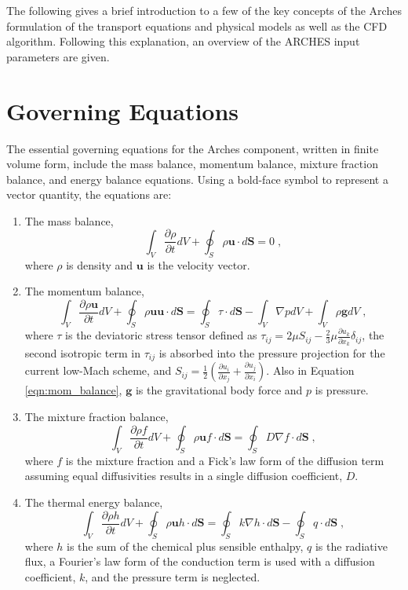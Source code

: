 The following gives a brief introduction to a few of the key concepts of the Arches formulation of the transport equations and physical models as well as the CFD algorithm.  Following this explanation, an overview of the ARCHES input parameters are given.  

\section{Governing Equations}
%
The essential governing equations for the Arches component, written
in finite volume form, include the mass balance, momentum balance,
mixture fraction balance, and energy balance equations. Using a bold-face
symbol to represent a vector quantity, the equations are: 
\begin{enumerate}
\item The mass balance, \begin{equation}
\int_{V}\frac{\partial\rho}{\partial t}dV+\oint_{S}\rho\mathbf{u}\cdot d\mathbf{S}=0\;,\label{eqn:mass_balance}\end{equation}
 where $\rho$ is density and $\mathbf{u}$ is the velocity vector. 
\item The momentum balance, \begin{equation}
\int_{V}\frac{\partial\rho\mathbf{u}}{\partial t}dV+\oint_{S}\rho\mathbf{uu}\cdot d\mathbf{S}=\oint_{S}\tau\cdot d\mathbf{S}-\int_{V}\nabla pdV+\int_{V}\rho\mathbf{g}dV\;,\label{eqn:mom_balance}\end{equation}
 where $\tau$ is the deviatoric stress tensor defined as $\tau_{ij}=2\mu S_{ij}-\frac{2}{3}\mu\frac{\partial u_{k}}{\partial x_{k}}\delta_{ij}$,
the second isotropic term in $\tau_{ij}$ is absorbed into the pressure
projection for the current low-Mach scheme, and $S_{ij}=\frac{1}{2}\left(\frac{\partial u_{i}}{\partial x_{j}}+\frac{\partial u_{j}}{\partial x_{i}}\right)$.
Also in Equation \ref{eqn:mom_balance}, $\mathbf{g}$ is the gravitational
body force and $p$ is pressure. 
\item The mixture fraction balance, \begin{equation}
\int_{V}\frac{\partial\rho f}{\partial t}dV+\oint_{S}\rho\mathbf{u}f\cdot d\mathbf{S}=\oint_{S}D\nabla f\cdot d\mathbf{S}\;,\label{eqn:species_balance}\end{equation}
 where $f$ is the mixture fraction and a Fick's law form of the diffusion
term assuming equal diffusivities results in a single diffusion coefficient,
$D$. 
\item The thermal energy balance, \begin{equation}
\int_{V}\frac{\partial\rho h}{\partial t}dV+\oint_{S}\rho\mathbf{u}h\cdot d\mathbf{S}=\oint_{S}k\nabla h\cdot d\mathbf{S}-\oint_{S}q\cdot d\mathbf{S}\;,\label{eqn:heat_balance}\end{equation}
 where $h$ is the sum of the chemical plus sensible enthalpy, $q$
is the radiative flux, a Fourier's law form of the conduction term
is used with a diffusion coefficient, $k$, and the pressure term
is neglected. 
\end{enumerate}
